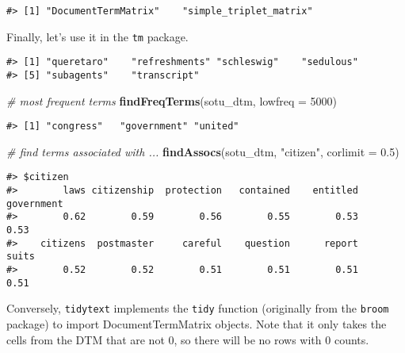 \documentclass[]{book}
\newenvironment{Shaded}{\begin{snugshade}}{\end{snugshade}}
\newcommand{\CommentTok}[1]{\textcolor[rgb]{0.56,0.35,0.01}{\textit{#1}}}
\newcommand{\DataTypeTok}[1]{\textcolor[rgb]{0.13,0.29,0.53}{#1}}
\newcommand{\DecValTok}[1]{\textcolor[rgb]{0.00,0.00,0.81}{#1}}
\newcommand{\FloatTok}[1]{\textcolor[rgb]{0.00,0.00,0.81}{#1}}
\newcommand{\KeywordTok}[1]{\textcolor[rgb]{0.13,0.29,0.53}{\textbf{#1}}}
\newcommand{\NormalTok}[1]{#1}
\newcommand{\OperatorTok}[1]{\textcolor[rgb]{0.81,0.36,0.00}{\textbf{#1}}}
\newcommand{\StringTok}[1]{\textcolor[rgb]{0.31,0.60,0.02}{#1}}
\begin{document}
\begin{verbatim}
#> [1] "DocumentTermMatrix"    "simple_triplet_matrix"
\end{verbatim}

Finally, let's use it in the \texttt{tm} package.

\begin{Shaded}
\end{Shaded}

\begin{verbatim}
#> [1] "queretaro"    "refreshments" "schleswig"    "sedulous"    
#> [5] "subagents"    "transcript"
\end{verbatim}

\begin{Shaded}
\begin{Highlighting}[]
\CommentTok{# most frequent terms}
\KeywordTok{findFreqTerms}\NormalTok{(sotu_dtm, }\DataTypeTok{lowfreq =} \DecValTok{5000}\NormalTok{)}
\end{Highlighting}
\end{Shaded}

\begin{verbatim}
#> [1] "congress"   "government" "united"
\end{verbatim}

\begin{Shaded}
\begin{Highlighting}[]
\CommentTok{# find terms associated with ...}
\KeywordTok{findAssocs}\NormalTok{(sotu_dtm, }\StringTok{"citizen"}\NormalTok{, }\DataTypeTok{corlimit =} \FloatTok{0.5}\NormalTok{)}
\end{Highlighting}
\end{Shaded}

\begin{verbatim}
#> $citizen
#>        laws citizenship  protection   contained    entitled  government 
#>        0.62        0.59        0.56        0.55        0.53        0.53 
#>    citizens  postmaster     careful    question      report       suits 
#>        0.52        0.52        0.51        0.51        0.51        0.51
\end{verbatim}

Conversely, \texttt{tidytext} implements the \texttt{tidy} function (originally from the \texttt{broom} package) to import DocumentTermMatrix objects. Note that it only takes the cells from the DTM that are not 0, so there will be no rows with 0 counts.
\end{document}

